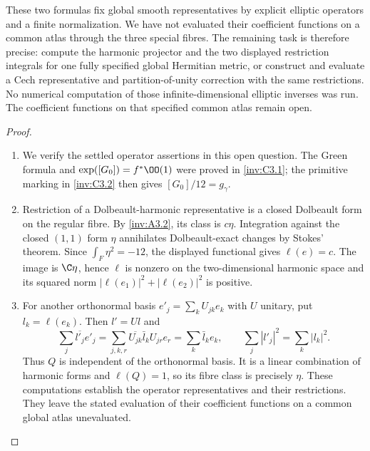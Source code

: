 \begin{question}
These two formulas fix global smooth representatives by explicit
elliptic operators and a finite normalization.  We have not evaluated
their coefficient functions on a common atlas through the three
special fibres.  The remaining task is therefore precise: compute
the harmonic projector and the two displayed restriction integrals
for one fully specified global Hermitian metric, or construct and
evaluate a Cech representative and partition-of-unity correction
with the same restrictions.  No numerical computation of those
infinite-dimensional elliptic inverses was run.  The coefficient functions on that specified common atlas remain open.
\end{question}

\begin{proof}
\begin{enumerate}[label=\arabic*.,leftmargin=*]
\item We verify the settled operator assertions in this open question.
The Green formula and $\exp([G_0])=f^*\OO(1)$ were proved in
\ref{inv:C3.1}; the primitive marking in \ref{inv:C3.2} then gives
$[G_0]/12=g_\gamma$.

\item Restriction of a Dolbeault-harmonic representative is a closed
Dolbeault form on the regular fibre. By \ref{inv:A3.2}, its class
is $c\eta$. Integration against the closed $(1,1)$ form $\eta$
annihilates Dolbeault-exact changes by Stokes' theorem. Since
$\int_F\eta^2=-12$, the displayed functional gives $\ell(e)=c$.
The image is $\C\eta$, hence $\ell$ is nonzero on the
 two-dimensional harmonic space and its squared norm
$|\ell(e_1)|^2+|\ell(e_2)|^2$ is positive.

\item For another orthonormal basis $e'_j=\sum_k U_{jk}e_k$ with
$U$ unitary, put $l_k=\ell(e_k)$. Then $l'=Ul$ and
\[
 \sum_j\overline{l'_j}e'_j
 =\sum_{j,k,r}\overline{U_{jk}}\bar l_k U_{jr}e_r
 =\sum_k\bar l_ke_k,
 \qquad \sum_j|l'_j|^2=\sum_k|l_k|^2.
\]
Thus $Q$ is independent of the orthonormal basis. It is a linear
combination of harmonic forms and $\ell(Q)=1$, so its fibre class
is precisely $\eta$. These computations establish the operator
representatives and their restrictions. They leave the stated
evaluation of their coefficient functions on a common global
atlas unevaluated.
\end{enumerate}
\end{proof}


